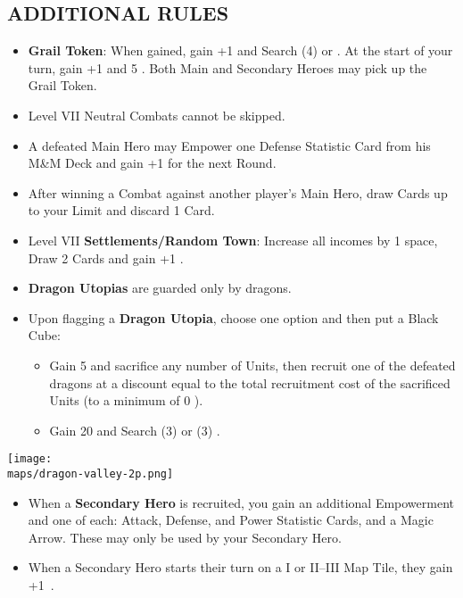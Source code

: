 \begin{multicols*}{2}
\subsection*{\MakeUppercase{Additional Rules}}
\begin{itemize}
  \item \textbf{Grail Token}: When gained, gain +1  and Search (4)  or . At the start of your turn, gain +1  and 5 . Both Main and Secondary Heroes may pick up the Grail Token.
  \item Level VII Neutral Combats cannot be skipped.
  \item A defeated Main Hero may Empower one Defense Statistic Card from his M\&M Deck and gain +1  for the next Round.
  \item After winning a Combat against another player's Main Hero, draw Cards up to your  Limit and discard 1 Card.
  \item Level VII \textbf{Settlements/Random Town}: Increase all incomes by 1 space, Draw 2 Cards and gain +1 .
  \item \textbf{Dragon Utopias} are guarded only by dragons.
  \item Upon flagging a \textbf{Dragon Utopia}, choose one option and then put a Black Cube:
  \begin{itemize}
    \item Gain 5  and sacrifice any number of Units, then recruit one of the defeated dragons at a discount equal to the total recruitment cost of the sacrificed Units (to a minimum of 0 ).
    \item Gain 20  and Search (3)  or (3) .
  \end{itemize}
\end{itemize}

\begin{center}
  \vspace*{\fill}
  \texttt{[image: \\maps/dragon-valley-2p.png]}
\end{center}

\begin{itemize}
  \item When a \textbf{Secondary Hero} is recruited, you gain an additional Empowerment and one of each: Attack, Defense, and Power Statistic Cards, and a Magic Arrow. These may only be used by your Secondary Hero.
  \item When a Secondary Hero starts their turn on a I or II--III Map Tile, they gain +1~.
\end{itemize}


\end{multicols*}

